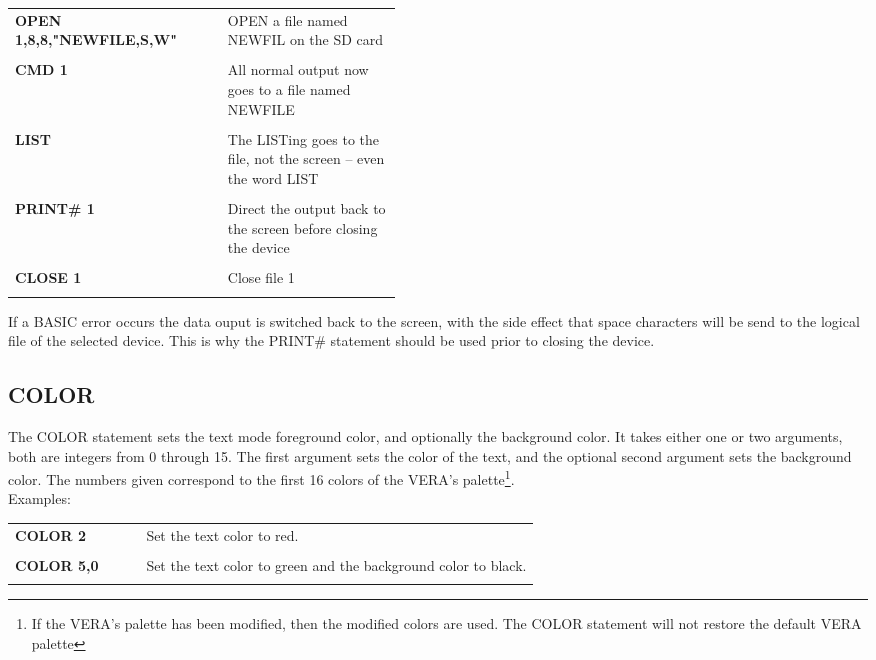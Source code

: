 \begin{tabular}{l p{0.45\linewidth}}

	{\ttfamily\bfseries OPEN 1,8,8,"NEWFILE,S,W"}&OPEN a file named {\ttfamily NEWFIL} on the SD card\\\\

	{\ttfamily\bfseries CMD 1}& All normal output now goes to a file named {\ttfamily NEWFILE}\\\\

	{\ttfamily\bfseries LIST}&The {\ttfamily LIST}ing goes to the file, not the screen -- even the word {\ttfamily LIST}\\\\

	{\ttfamily\bfseries PRINT\# 1}&Direct the output back to the screen before closing the device\\\\

	{\ttfamily\bfseries CLOSE 1}&Close file 1\\\\
	

\end{tabular}

If a BASIC error occurs the data ouput is switched back to the screen, with the
side effect that space characters will be send to the logical file of the
selected device.  This is why the {\ttfamily PRINT\#} statement should be used
prior to closing the device.\\

\subsection{COLOR}

The {\ttfamily COLOR} statement sets the text mode foreground color, and
optionally the background color.  It takes either one or two arguments, both
are integers from 0 through 15.  The first argument sets the color of the text,
and the optional second argument sets the background color.  The numbers given
correspond to the first 16 colors of the VERA's palette\footnote{If the VERA's
palette has been modified, then the modified colors are used.  The {\ttfamily
COLOR} statement will not restore the default VERA palette}.\\

Examples:\\

\begin{tabular}{l p{0.75\linewidth}}

	{\ttfamily\bfseries COLOR 2}&Set the text color to red.\\\\

	{\ttfamily\bfseries COLOR 5,0}&Set the text color to green and the
	background color to black.\\\\

\end{tabular}

